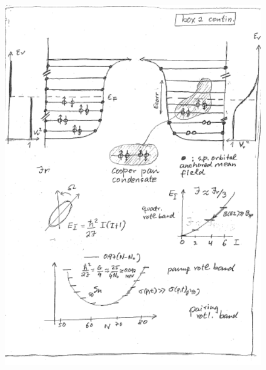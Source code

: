 \documentclass[a4paper,11pt]{book}
\numberwithin{equation}{section}
\numberwithin{figure}{section}
\numberwithin{table}{section}
\begin{document}
\begin{figure}
\centerline{\includegraphics*[width=\textwidth,angle=0]{figs/box2_2.pdf}}
\caption{}\label{box2}
\end{figure}
\end{document}
